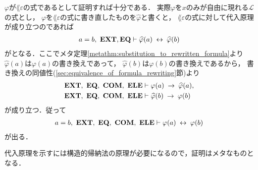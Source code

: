 	$\varphi$が$\lang{\varepsilon}$の式であるとして証明すれば十分である．
	実際$\varphi$を$x$のみが自由に現れる$\mathcal{L}$の式とし，
	$\varphi$を$\lang{\varepsilon}$の式に書き直したものを$\widehat{\varphi}$と書くと，
	$\lang{\varepsilon}$の式に対して代入原理が成り立つのであれば
	\begin{align}
		a = b,\ \mbox{{\bf EXT}},\mbox{{\bf EQ}} \vdash \widehat{\varphi}(a) \hspace{0.25em}\leftrightarrow\hspace{0.25em} \widehat{\varphi}(b)
	\end{align}
	がとなる．ここでメタ定理\ref{metathm:substitution_to_rewritten_formula}より
	$\widehat{\varphi}(a)$は$\varphi(a)$の書き換えであって，
	$\widehat{\varphi}(b)$は$\varphi(b)$の書き換えであるから，
	書き換えの同値性(\ref{sec:equivalence_of_formula_rewriting}節)より
	\begin{align}
		\mbox{{\bf EXT}},\ \mbox{{\bf EQ}},\ \mbox{\bf COM},\ \mbox{{\bf ELE}} &\vdash \varphi(a) \hspace{0.25em}\rightarrow\hspace{0.25em} \widehat{\varphi}(a), \\
		\mbox{{\bf EXT}},\ \mbox{{\bf EQ}},\ \mbox{\bf COM},\ \mbox{{\bf ELE}} &\vdash \widehat{\varphi}(b) \hspace{0.25em}\rightarrow\hspace{0.25em} \varphi(b)
	\end{align}
	が成り立つ．従って
	\begin{align}
		a = b,\ \mbox{{\bf EXT}},\ \mbox{{\bf EQ}},\ \mbox{\bf COM},\ \mbox{{\bf ELE}} \vdash \varphi(a) \hspace{0.25em}\leftrightarrow\hspace{0.25em} \varphi(b)
	\end{align}
	が出る．
	
	代入原理を示すには構造的帰納法の原理が必要になるので，証明はメタなものとなる．
	
